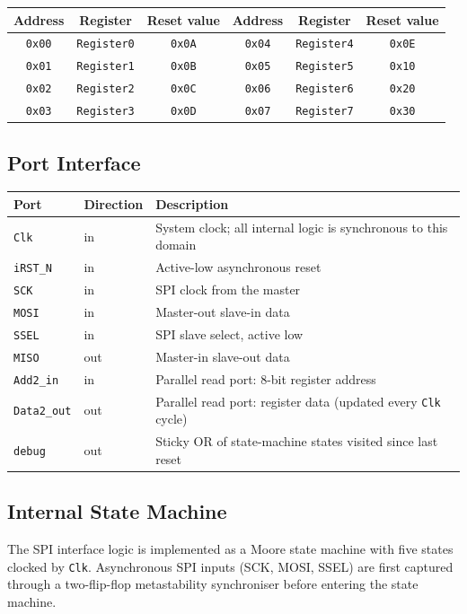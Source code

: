 \documentclass[11pt]{article}
\begin{document}
\begin{center}
\begin{tabular}{ccc|ccc}
\toprule
Address & Register & Reset value & Address & Register & Reset value \\
\midrule
\texttt{0x00} & \texttt{Register0} & \texttt{0x0A} & \texttt{0x04} & \texttt{Register4} & \texttt{0x0E} \\
\texttt{0x01} & \texttt{Register1} & \texttt{0x0B} & \texttt{0x05} & \texttt{Register5} & \texttt{0x10} \\
\texttt{0x02} & \texttt{Register2} & \texttt{0x0C} & \texttt{0x06} & \texttt{Register6} & \texttt{0x20} \\
\texttt{0x03} & \texttt{Register3} & \texttt{0x0D} & \texttt{0x07} & \texttt{Register7} & \texttt{0x30} \\
\bottomrule
\end{tabular}
\end{center}

\subsection{Port Interface}
\begin{center}
\begin{tabular}{llp{8cm}}
\toprule
Port & Direction & Description \\
\midrule
\texttt{Clk}       & in  & System clock; all internal logic is synchronous to this domain \\
\texttt{iRST\_N}   & in  & Active-low asynchronous reset \\
\texttt{SCK}       & in  & SPI clock from the master \\
\texttt{MOSI}      & in  & Master-out slave-in data \\
\texttt{SSEL}      & in  & SPI slave select, active low \\
\texttt{MISO}      & out & Master-in slave-out data \\
\texttt{Add2\_in}  & in  & Parallel read port: 8-bit register address \\
\texttt{Data2\_out}& out & Parallel read port: register data (updated every \texttt{Clk} cycle) \\
\texttt{debug}     & out & Sticky OR of state-machine states visited since last reset \\
\bottomrule
\end{tabular}
\end{center}

\subsection{Internal State Machine}
The SPI interface logic is implemented as a Moore state machine with five states clocked by \texttt{Clk}. Asynchronous SPI inputs (SCK, MOSI, SSEL) are first captured through a two-flip-flop metastability synchroniser before entering the state machine.
\end{document}
